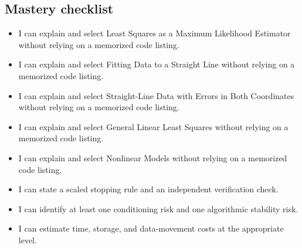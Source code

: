 \documentclass[10pt,letterpaper]{article}
\begin{document}
\subsection*{Mastery checklist}
\begin{itemize}
\item[$\square$] I can explain and select Least Squares as a Maximum Likelihood Estimator without relying on a memorized code listing.
\item[$\square$] I can explain and select Fitting Data to a Straight Line without relying on a memorized code listing.
\item[$\square$] I can explain and select Straight-Line Data with Errors in Both Coordinates without relying on a memorized code listing.
\item[$\square$] I can explain and select General Linear Least Squares without relying on a memorized code listing.
\item[$\square$] I can explain and select Nonlinear Models without relying on a memorized code listing.
\item[$\square$] I can state a scaled stopping rule and an independent verification check.
\item[$\square$] I can identify at least one conditioning risk and one algorithmic stability risk.
\item[$\square$] I can estimate time, storage, and data-movement costs at the appropriate level.
\end{itemize}
\end{document}
